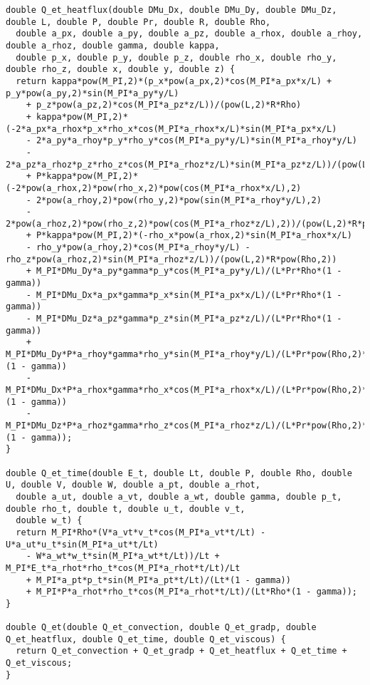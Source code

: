 \documentclass[10pt]{article}
\begin{document}
\begin{footnotesize}
\begin{verbatim}
double Q_et_heatflux(double DMu_Dx, double DMu_Dy, double DMu_Dz, double L, double P, double Pr, double R, double Rho, 
  double a_px, double a_py, double a_pz, double a_rhox, double a_rhoy, double a_rhoz, double gamma, double kappa, 
  double p_x, double p_y, double p_z, double rho_x, double rho_y, double rho_z, double x, double y, double z) {
  return kappa*pow(M_PI,2)*(p_x*pow(a_px,2)*cos(M_PI*a_px*x/L) + p_y*pow(a_py,2)*sin(M_PI*a_py*y/L) 
	+ p_z*pow(a_pz,2)*cos(M_PI*a_pz*z/L))/(pow(L,2)*R*Rho) 
	+ kappa*pow(M_PI,2)*(-2*a_px*a_rhox*p_x*rho_x*cos(M_PI*a_rhox*x/L)*sin(M_PI*a_px*x/L) 
	- 2*a_py*a_rhoy*p_y*rho_y*cos(M_PI*a_py*y/L)*sin(M_PI*a_rhoy*y/L) 
	- 2*a_pz*a_rhoz*p_z*rho_z*cos(M_PI*a_rhoz*z/L)*sin(M_PI*a_pz*z/L))/(pow(L,2)*R*pow(Rho,2)) 
	+ P*kappa*pow(M_PI,2)*(-2*pow(a_rhox,2)*pow(rho_x,2)*pow(cos(M_PI*a_rhox*x/L),2) 
	- 2*pow(a_rhoy,2)*pow(rho_y,2)*pow(sin(M_PI*a_rhoy*y/L),2) 
	- 2*pow(a_rhoz,2)*pow(rho_z,2)*pow(cos(M_PI*a_rhoz*z/L),2))/(pow(L,2)*R*pow(Rho,3)) 
	+ P*kappa*pow(M_PI,2)*(-rho_x*pow(a_rhox,2)*sin(M_PI*a_rhox*x/L) 
	- rho_y*pow(a_rhoy,2)*cos(M_PI*a_rhoy*y/L) - rho_z*pow(a_rhoz,2)*sin(M_PI*a_rhoz*z/L))/(pow(L,2)*R*pow(Rho,2)) 
	+ M_PI*DMu_Dy*a_py*gamma*p_y*cos(M_PI*a_py*y/L)/(L*Pr*Rho*(1 - gamma)) 
	- M_PI*DMu_Dx*a_px*gamma*p_x*sin(M_PI*a_px*x/L)/(L*Pr*Rho*(1 - gamma)) 
	- M_PI*DMu_Dz*a_pz*gamma*p_z*sin(M_PI*a_pz*z/L)/(L*Pr*Rho*(1 - gamma)) 
	+ M_PI*DMu_Dy*P*a_rhoy*gamma*rho_y*sin(M_PI*a_rhoy*y/L)/(L*Pr*pow(Rho,2)*(1 - gamma)) 
	- M_PI*DMu_Dx*P*a_rhox*gamma*rho_x*cos(M_PI*a_rhox*x/L)/(L*Pr*pow(Rho,2)*(1 - gamma)) 
	- M_PI*DMu_Dz*P*a_rhoz*gamma*rho_z*cos(M_PI*a_rhoz*z/L)/(L*Pr*pow(Rho,2)*(1 - gamma));
}

double Q_et_time(double E_t, double Lt, double P, double Rho, double U, double V, double W, double a_pt, double a_rhot, 
  double a_ut, double a_vt, double a_wt, double gamma, double p_t, double rho_t, double t, double u_t, double v_t, 
  double w_t) {
  return M_PI*Rho*(V*a_vt*v_t*cos(M_PI*a_vt*t/Lt) - U*a_ut*u_t*sin(M_PI*a_ut*t/Lt) 
	- W*a_wt*w_t*sin(M_PI*a_wt*t/Lt))/Lt + M_PI*E_t*a_rhot*rho_t*cos(M_PI*a_rhot*t/Lt)/Lt 
	+ M_PI*a_pt*p_t*sin(M_PI*a_pt*t/Lt)/(Lt*(1 - gamma)) 
	+ M_PI*P*a_rhot*rho_t*cos(M_PI*a_rhot*t/Lt)/(Lt*Rho*(1 - gamma));
}

double Q_et(double Q_et_convection, double Q_et_gradp, double Q_et_heatflux, double Q_et_time, double Q_et_viscous) {
  return Q_et_convection + Q_et_gradp + Q_et_heatflux + Q_et_time + Q_et_viscous;
}


\end{verbatim}
\end{footnotesize}
 



\appendix


\end{document}
